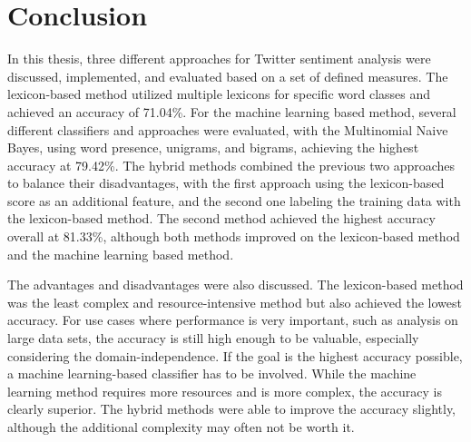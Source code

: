 \chapter{Conclusion}
\label{cha:Chapter5_Conclusion}

\iffalse

Length: 1-2 pages

Effort: 1-2 days


Zusammenfassung der Ergebnisse, Ausblick --> was kann man noch machen, auf Ergebnisse aufbauen, weiterfuehrende Themen

Beim Erstellen der Arbeit --> nicht jeder Idee hinterherrennen, eher dann fuer Conclusion

Implementation source code --> muss nicht sein, kann auch ein link auf github sein

\fi

In this thesis, three different approaches for Twitter sentiment analysis were discussed, implemented, and evaluated based on a set of defined measures. The lexicon-based method utilized multiple lexicons for specific word classes and achieved an accuracy of 71.04\%. For the machine learning based method, several different classifiers and approaches were evaluated, with the Multinomial Naive Bayes, using word presence, unigrams, and bigrams, achieving the highest accuracy at 79.42\%. The hybrid methods combined the previous two approaches to balance their disadvantages, with the first approach using the lexicon-based score as an additional feature, and the second one labeling the training data with the lexicon-based method. The second method achieved the highest accuracy overall at 81.33\%, although both methods improved on the lexicon-based method and the machine learning based method.

The advantages and disadvantages were also discussed. The lexicon-based method was the least complex and resource-intensive method but also achieved the lowest accuracy. For use cases where performance is very important, such as analysis on large data sets, the accuracy is still high enough to be valuable, especially considering the domain-independence. If the goal is the highest accuracy possible, a machine learning-based classifier has to be involved. While the machine learning method requires more resources and is more complex, the accuracy is clearly superior. The hybrid methods were able to improve the accuracy slightly, although the additional complexity may often not be worth it.

